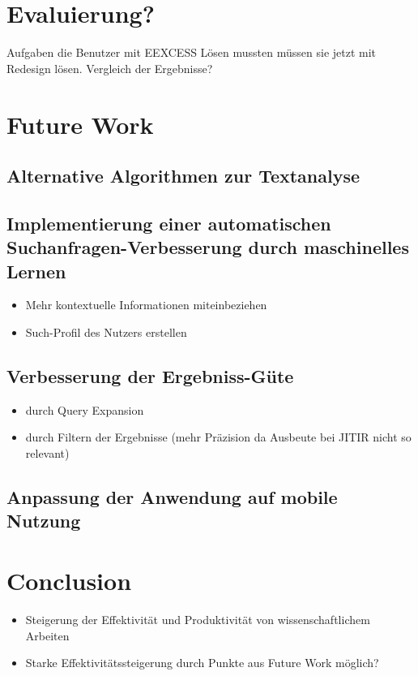 \section{Evaluierung?}
Aufgaben die Benutzer mit EEXCESS Lösen mussten müssen sie jetzt mit Redesign lösen. Vergleich der Ergebnisse?

\section{Future Work}
 \subsection{Alternative Algorithmen zur Textanalyse}
 \subsection{Implementierung einer automatischen Suchanfragen-Verbesserung durch maschinelles Lernen}
 	\begin{itemize}
 		\item Mehr kontextuelle Informationen miteinbeziehen
 		\item Such-Profil des Nutzers erstellen
 	\end{itemize}
 \subsection{Verbesserung der Ergebniss-Güte}
	\begin{itemize}
		\item durch Query Expansion
 		\item durch Filtern der Ergebnisse (mehr Präzision da Ausbeute bei JITIR nicht so relevant)
	\end{itemize}
 \subsection{Anpassung der Anwendung auf mobile Nutzung}

 \section{Conclusion}
 \begin{itemize}
 		\item Steigerung der Effektivität und Produktivität von wissenschaftlichem Arbeiten
 		\item Starke Effektivitätssteigerung durch Punkte aus Future Work möglich?
 	\end{itemize}